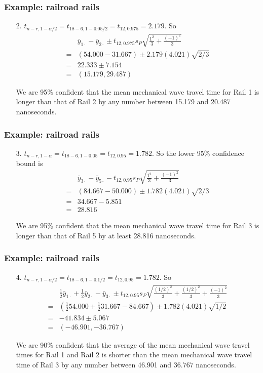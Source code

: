\documentclass[handout]{beamer}\usepackage[]{graphicx}\usepackage[]{color}
\numberwithin{equation}{section}
\begin{document}
\begin{frame}
\frametitle{Example: railroad rails}
\begin{itemize}
\item[2.]
$t_{n-r, 1 - \alpha/2} = t_{18 - 6, 1 - 0.05/2} = t_{12, 0.975} = 2.179$. So
\begin{align*}
&\bar{y}_{1\cdot} - \bar{y}_{2\cdot} \pm t_{12, 0.975} s_P \sqrt{\frac{1^2}{3} + \frac{(-1)^2}{3}}\\ = & (54.000 - 31.667) \pm 2.179(4.021)\sqrt{2/3} \\
=& 22.333 \pm 7.154 \\
= & (15.179, 29.487)
\end{align*}

We are 95\% confident that the mean mechanical wave travel time for Rail 1 is longer than that of Rail 2 by any number between 15.179 and 20.487 nanoseconds.
\end{itemize}
\end{frame}

\begin{frame}
\frametitle{Example: railroad rails}
\begin{itemize}
\item[3.]
$t_{n-r, 1 - \alpha} = t_{18 - 6, 1 - 0.05} = t_{12, 0.95} = 1.782$. So the lower 95\% confidence bound is
\begin{align*}
&\bar{y}_{3\cdot} - \bar{y}_{5\cdot} - t_{12, 0.95} s_P \sqrt{\frac{1^2}{3} + \frac{(-1)^2}{3}}\\ = & (84.667 - 50.000) \pm 1.782(4.021)\sqrt{2/3} \\
=&  34.667 - 5.851 \\
= & 28.816
\end{align*}

We are 95\% confident that the mean mechanical wave travel time for Rail 3 is longer than that of Rail 5 by at least 28.816 nanoseconds.
\end{itemize}
\end{frame}

\begin{frame}
\frametitle{Example: railroad rails}
\begin{itemize}
\item[4.]
$t_{n-r, 1 - \alpha/2} = t_{18 - 6, 1 - 0.1/2} = t_{12, 0.95} = 1.782$. So
\begin{align*}
&\frac{1}{2}\bar{y}_{1\cdot} + \frac{1}{2}\bar{y}_{2\cdot} - \bar{y}_{3\cdot} \pm t_{12, 0.95} s_P \sqrt{\frac{(1/2)^2}{3} + \frac{(1/2)^2}{3} + \frac{(-1)^2}{3}}\\ = & (\frac{1}{2}54.000 + \frac{1}{2}31.667 - 84.667) \pm 1.782(4.021)\sqrt{1/2} \\
=& -41.834 \pm 5.067 \\
= & (-46.901, -36.767)
\end{align*}

We are 90\% confident that the average of the mean mechanical wave travel times for Rail 1 and Rail 2 is shorter than the mean mechanical wave travel time of Rail 3 by any number between 46.901 and 36.767 nanoseconds.
\end{itemize}
\end{frame}
\end{document}
